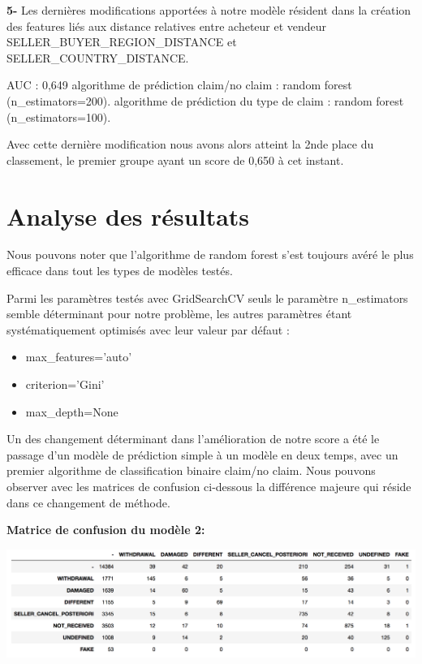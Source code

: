\textbf{5-} Les dernières modifications apportées à notre modèle résident dans la création
des features liés aux distance relatives entre acheteur et vendeur SELLER_BUYER_REGION_DISTANCE 
et SELLER_COUNTRY_DISTANCE. 

AUC : 0,649
algorithme de prédiction claim/no claim : random forest (n_estimators=200).
algorithme de prédiction du type de claim : random forest (n_estimators=100).

Avec cette dernière modification nous avons alors atteint la 2nde place du classement,
le premier groupe ayant un score de 0,650 à cet instant.

\section{Analyse des résultats}

Nous pouvons noter que l'algorithme de random forest s'est toujours avéré le plus efficace
dans tout les types de modèles testés.

Parmi les paramètres testés avec GridSearchCV seuls le paramètre n_estimators semble 
déterminant pour notre problème, les autres paramètres étant systématiquement optimisés
avec leur valeur par défaut :

\begin{itemize}
\item max_features='auto'
\item criterion='Gini'
\item max_depth=None
\end{itemize}

Un des changement déterminant dans l'amélioration de notre score a été le passage d'un
modèle de prédiction simple à un modèle en deux temps, avec un premier algorithme
de classification binaire claim/no claim. Nous pouvons observer avec les matrices de confusion
ci-dessous la différence majeure qui réside dans ce changement de méthode.

\vspace{0.5cm}
\textbf{Matrice de confusion du modèle 2:}
\vspace{0.5cm}
\begin{center}
\includegraphics[scale=0.5]{assets/confmat1} 
\end{center}
\vspace{1.5cm}


